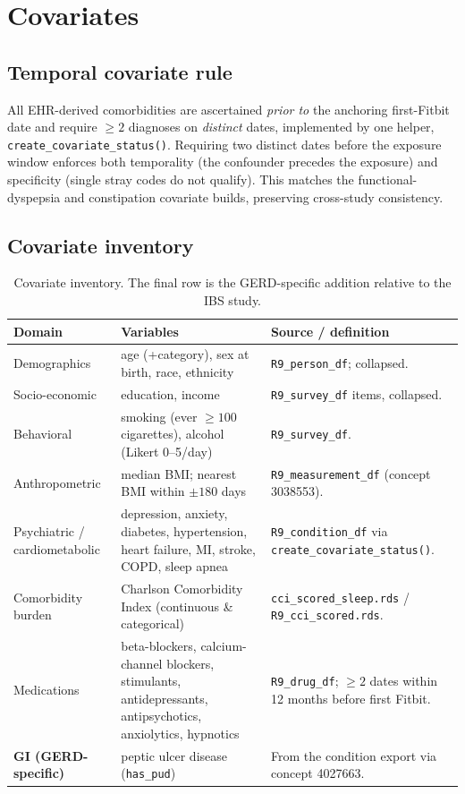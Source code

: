 \documentclass[11pt]{article}
\newcommand{\code}[1]{\texttt{\small #1}}
\begin{document}
\section{Covariates}

\subsection{Temporal covariate rule}
All EHR-derived comorbidities are ascertained \emph{prior to} the anchoring first-Fitbit date and
require $\geq 2$ diagnoses on \emph{distinct} dates, implemented by one helper,
\code{create_covariate_status()}. Requiring two distinct dates before the exposure window enforces both
temporality (the confounder precedes the exposure) and specificity (single stray codes do not qualify).
This matches the functional-dyspepsia and constipation covariate builds, preserving cross-study
consistency.

\subsection{Covariate inventory}
\begin{table}[h]
\centering
\footnotesize
\begin{tabular}{@{}p{3.2cm}p{4.6cm}p{5.2cm}@{}}
\toprule
\textbf{Domain} & \textbf{Variables} & \textbf{Source / definition} \\
\midrule
Demographics & age (+category), sex at birth, race, ethnicity & \code{R9_person_df}; collapsed. \\
Socio-economic & education, income & \code{R9_survey_df} items, collapsed. \\
Behavioral & smoking (ever $\geq 100$ cigarettes), alcohol (Likert 0--5/day) & \code{R9_survey_df}. \\
Anthropometric & median BMI; nearest BMI within $\pm 180$ days & \code{R9_measurement_df} (concept 3038553). \\
Psychiatric / cardiometabolic & depression, anxiety, diabetes, hypertension, heart failure, MI, stroke, COPD, sleep apnea & \code{R9_condition_df} via \code{create_covariate_status()}. \\
Comorbidity burden & Charlson Comorbidity Index (continuous \& categorical) & \code{cci_scored_sleep.rds} / \code{R9_cci_scored.rds}. \\
Medications & beta-blockers, calcium-channel blockers, stimulants, antidepressants, antipsychotics, anxiolytics, hypnotics & \code{R9_drug_df}; $\geq 2$ dates within 12 months before first Fitbit. \\
\textbf{GI (GERD-specific)} & peptic ulcer disease (\code{has_pud}) & From the condition export via concept 4027663. \\
\bottomrule
\end{tabular}
\caption{Covariate inventory. The final row is the GERD-specific addition relative to the IBS study.}
\end{table}
\end{document}
